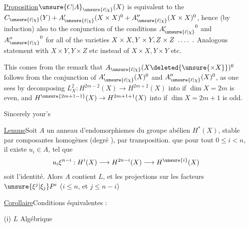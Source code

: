 \uline{Proposition}\quad $\unsure{C|A}_{\unsure{\ell|\chi}}(X)$ is equivalent to the  $C_{\unsure{\ell|\chi}}(Y)+A'_{\unsure{\ell|\chi}}(X\times X)^0+A''_{\unsure{\ell|\chi}}(X\times X)^0$, hence (by induction) also to the conjunction of the conditions ${A'_{\unsure{\ell|\chi}}}^0$ and ${A''_{\unsure{\ell|\chi}}}^0$ for all of the varieties $X\times X,Y\times Y,Z\times Z\ \mathinner{\ldotp\ldotp\ldotp\ldotp}\ .$ Analogous statement with $X\times Y,Y\times Z$ etc instead of $X\times X,Y\times Y$ etc.

This comes from the remark that  $A_{\unsure{\ell|\chi}}(X\deleted{\unsure{\times X}})^0$ follows from the conjunction of $A'_{\unsure{\ell|\chi}}(X)^0$ and $A''_{\unsure{\ell|\chi}}(X)^0$, as one sees by decomposing $L_X^2:H^{2m-2}(X)\to H^{2m+2}(X)$ into
if $\dim X=2m$ is even, and $H^{\unsure{2m+1-1}}(X)\to H^{2m+1+1}(X)$ into
if $\dim X=2m+1$ is odd.

Sincerely your's



\uline{Lemme}\quad Soit $A$ un anneau d'endomorphismes du groupe abélien $H^*(X)$, stable par composantes homogènes (degré ), par transposition.   que pour tout $0\leq i<n$, il existe $u_i\in A$,  tel que
\[
u_i\xi^{n-i}:H^i(X)\longrightarrow H^{2n-i}(X)\longrightarrow H^{\unsure{i}}(X)
\]
soit l'identité.
Alors $A$ contient $L$\unsure{!},  et les projections sur les facteurs  $\unsure{\xi^j|\xi_j}P^i$ ($i\leq n$, et  $j\leq n-i$)

\uline{Corollaire}\quad Conditions équivalentes :

(i) $L$ Algébrique

